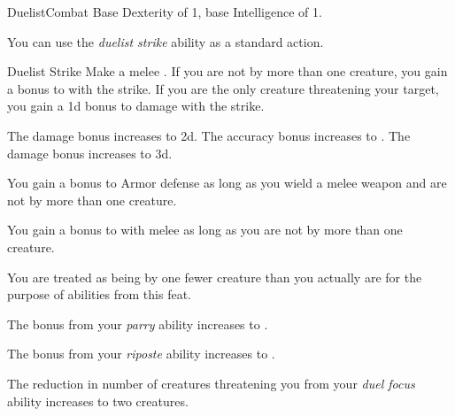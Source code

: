     \begin{feat}{Duelist}{Combat}
        \featpre Base Dexterity of 1, base Intelligence of 1.

         You can use the \textit{duelist strike} ability as a standard action.
        \begin{freeability}{Duelist Strike}
            Make a melee .
            If you are not  by more than one creature, you gain a  bonus to  with the strike.
            If you are the only creature threatening your target, you gain a \plus1d bonus to damage with the strike.

            \rankline
             The damage bonus increases to \plus2d.
             The accuracy bonus increases to .
             The damage bonus increases to \plus3d.
        \end{freeability}

         You gain a  bonus to Armor defense as long as you wield a melee weapon and are not  by more than one creature.

         You gain a  bonus to  with melee  as long as you are not  by more than one creature.

         You are treated as being  by one fewer creature than you actually are for the purpose of abilities from this feat.

         The bonus from your \textit{parry} ability increases to .

         The bonus from your \textit{riposte} ability increases to .

         The reduction in number of creatures threatening you from your \textit{duel focus} ability increases to two creatures.
    \end{feat}

